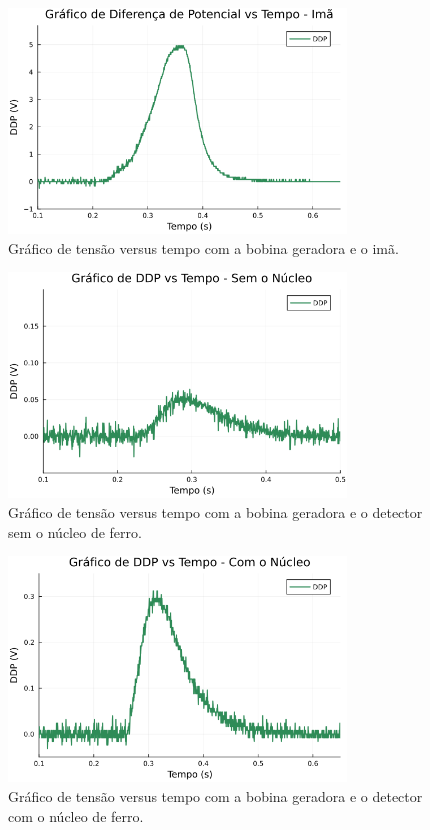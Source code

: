 \documentclass[column,brazilian,12pt,a4paper,final]{article}
\begin{document}
\begin{figure}[H]
    \centering
    \includegraphics[width=0.8\textwidth]{figuras/grafico_diferenca_potencial - 1.png}
    \caption{Gráfico de tensão versus tempo com a bobina geradora e o imã.}
    \label{fig:grafico1}
\end{figure}
\begin{figure}[H]
    \centering
    \includegraphics[width=0.8\textwidth]{figuras/grafico_diferenca_potencial - 2.png}
    \caption{Gráfico de tensão versus tempo com a bobina geradora e o detector sem o núcleo de ferro.}
    \label{fig:grafico2}
\end{figure}
\begin{figure}[H]
    \centering
    \includegraphics[width=0.8\textwidth]{figuras/grafico_diferenca_potencial - 3.png}
    \caption{Gráfico de tensão versus tempo com a bobina geradora e o detector com o núcleo de ferro.}
    \label{fig:grafico3}
\end{figure}
\end{document}
